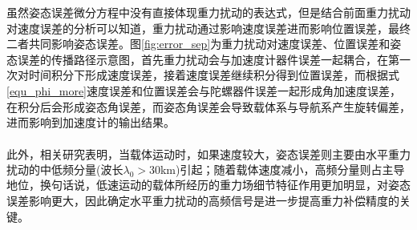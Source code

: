 \documentclass[12pt,a4,utf8]{article}
\newcommand{\upcite}[1]{\textsuperscript{\textsuperscript{\cite{#1}}}} %
\begin{document}
虽然姿态误差微分方程中没有直接体现重力扰动的表达式，但是结合前面重力扰动对速度误差的分析可以知道，重力扰动通过影响速度误差进而影响位置误差，最终二者共同影响姿态误差。图\ref{fig:error_sep}为重力扰动对速度误差、位置误差和姿态误差的传播路径示意图，首先重力扰动会与加速度计器件误差一起耦合，在第一次对时间积分下形成速度误差，接着速度误差继续积分得到位置误差，而根据式\ref{equ_phi_more}速度误差和位置误差会与陀螺器件误差一起形成角加速度误差，在积分后会形成姿态角误差，而姿态角误差会导致载体系与导航系产生旋转偏差，进而影响到加速度计的输出结果。

此外，相关研究表明\upcite{jekeli1994airborne,1020386196.nh,harriman1986gravity,Zhangpanpan23}，当载体运动时，如果速度较大，姿态误差则主要由水平重力扰动的中低频分量(波长$\lambda_0>30$km)引起；随着载体速度减小，高频分量则占主导地位，换句话说，低速运动的载体所经历的重力场细节特征作用更加明显，对姿态误差影响更大，因此确定水平重力扰动的高频信号是进一步提高重力补偿精度的关键。
\end{document}
